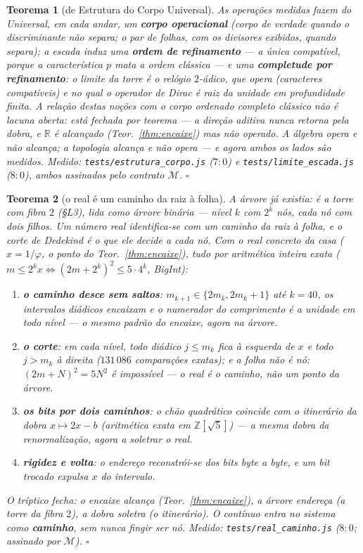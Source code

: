 \documentclass[11pt,a4paper]{article}
\newtheorem{teorema}{Teorema}
\newcommand{\code}[1]{\texttt{\small #1}}
\begin{document}
\begin{teorema}[de Estrutura do Corpo Universal]\label{thm:estrutura}
As operações medidas fazem do Universal, em cada andar, um
\textbf{corpo operacional} (corpo de verdade quando o discriminante
não separa; o par de folhas, com os divisores exibidos, quando
separa); a escada induz uma \textbf{ordem de refinamento} --- a única
compatível, porque a característica $p$ mata a ordem clássica --- e
uma \textbf{completude por refinamento}: o limite da torre é o relógio
$2$-ádico, que \emph{opera} (caracteres compatíveis) e no qual o
operador de Dirac é raiz da unidade em profundidade finita. A relação
destas noções com o corpo ordenado completo clássico não é lacuna
aberta: está \emph{fechada por teorema} --- a direção aditiva nunca
retorna pela dobra, e $\mathbb{R}$ é alcançado (Teor.~\ref{thm:encaixe})
mas não operado. \emph{A álgebra opera e não alcança; a topologia
alcança e não opera} --- e agora ambos os lados são medidos.
\emph{Medido:} \code{tests/estrutura\_corpo.js} ($7{:}0$) e
\code{tests/limite\_escada.js} ($8{:}0$), ambos assinados pelo
contrato $\mathcal{M}$.
$\square$
\end{teorema}

\begin{teorema}[o real é um caminho da raiz à folha]\label{thm:real-caminho}
A árvore já existia: é a torre com fibra $2$ (\S L3), lida como árvore
binária --- nível $k$ com $2^{k}$ nós, cada nó com dois filhos. Um
número real identifica-se com um \emph{caminho da raiz à folha}, e o
corte de Dedekind é o que ele decide a cada nó. Com o real concreto da
casa ($x=1/\varphi$, o ponto do Teor.~\ref{thm:encaixe}), tudo por
aritmética inteira exata ($m\le2^{k}x\iff(2m+2^{k})^{2}\le5\cdot4^{k}$,
BigInt):
\begin{enumerate}
\item \textbf{o caminho desce sem saltos}: $m_{k+1}\in\{2m_{k},
2m_{k}{+}1\}$ até $k=40$, os intervalos diádicos encaixam e o
numerador do comprimento é a \emph{unidade} em todo nível --- o mesmo
padrão do encaixe, agora na árvore.
\item \textbf{o corte}: em cada nível, todo diádico $j\le m_{k}$
fica à esquerda de $x$ e todo $j>m_{k}$ à direita ($131\,086$
comparações exatas); e a folha \emph{não é nó}:
$(2m+N)^{2}=5N^{2}$ é imposs\'ivel --- o real é o caminho, não um
ponto da árvore.
\item \textbf{os bits por dois caminhos}: o chão quadrático coincide
com o \emph{itinerário da dobra} $x\mapsto2x-b$ (aritmética exata em
$\mathbb{Z}[\sqrt5]$) --- a mesma dobra da renormalização, agora a
soletrar o real.
\item \textbf{rigidez e volta}: o endereço reconstrói-se dos bits
byte a byte, e um bit trocado \emph{expulsa} $x$ do intervalo.
\end{enumerate}
O tríptico fecha: \emph{o encaixe alcança} (Teor.~\ref{thm:encaixe}),
\emph{a árvore endereça} (a torre da fibra $2$), \emph{a dobra
soletra} (o itinerário). O contínuo entra no sistema como
\textbf{caminho}, sem nunca fingir ser nó.
\emph{Medido:} \code{tests/real\_caminho.js} ($8{:}0$; assinado por
$\mathcal{M}$).
$\square$
\end{teorema}
\end{document}
